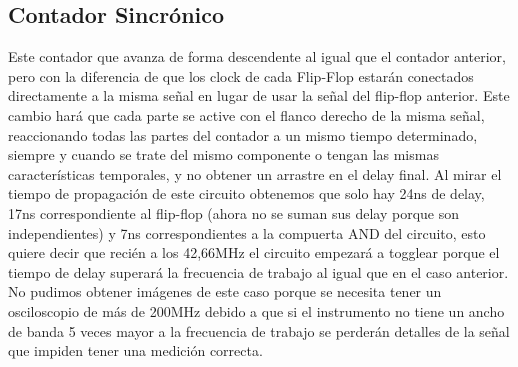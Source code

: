  



\subsection*{Contador Sincr\'onico}
Este contador que avanza de forma descendente al igual que el contador anterior, pero con la diferencia de que los clock de cada Flip-Flop estar\'an conectados directamente a la misma señal en lugar de usar la señal del flip-flop anterior. Este cambio har\'a que cada parte se active con el flanco derecho de la misma señal, reaccionando todas las partes del contador a un mismo tiempo determinado, siempre y cuando se trate del mismo componente o tengan las mismas caracter\'isticas temporales, y no obtener un arrastre en el delay final.
\newline
Al mirar el tiempo de propagaci\'on de este circuito obtenemos que solo hay 24ns de delay, 17ns correspondiente al flip-flop (ahora no se suman sus delay porque son independientes) y 7ns correspondientes a la compuerta AND del circuito, esto quiere decir que reci\'en a los 42,66MHz el circuito empezar\'a a togglear porque el tiempo de delay superar\'a la frecuencia de trabajo al igual que en el caso anterior. No pudimos obtener im\'agenes de este caso porque se necesita tener un osciloscopio de m\'as de 200MHz debido a que si el instrumento no tiene un ancho de banda 5 veces mayor a la frecuencia de trabajo se perder\'an detalles de la señal que impiden tener una medici\'on correcta.


